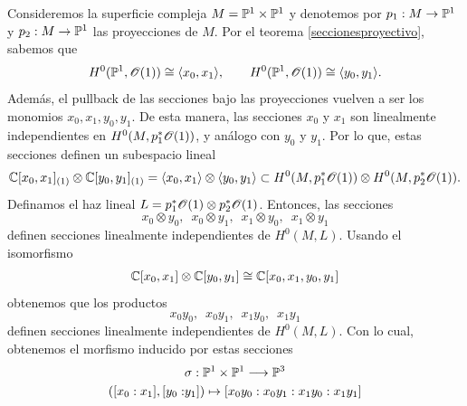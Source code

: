 	\begin{example}
		Consideremos la superficie compleja $M=\mathbb{P}^1\times\mathbb{P}^1$ y denotemos por $p_1:M\to \mathbb{P}^1$ y $p_2:M\to \mathbb{P}^1$ las proyecciones de $M$. Por el teorema \ref{seccionesproyectivo}, sabemos que
		\begin{equation*}
			H^0(\mathbb{P}^1,\mathscr{O}(1))\cong\langle x_0,x_1\rangle, \qquad H^0(\mathbb{P}^1,\mathscr{O}(1))\cong\langle y_0,y_1\rangle.
		\end{equation*}
		Además, el pullback de las secciones bajo las proyecciones vuelven a ser los monomios $x_0,x_1,y_0,y_1$. De esta manera, las secciones $x_0$ y $x_1$ son linealmente independientes en $H^0(M,p_1^*\mathscr{O}(1))$, y análogo con $y_0$ y $y_1$. Por lo que, estas secciones definen un subespacio lineal
		\begin{equation*}
			\mathbb{C}[x_0,x_1]_{(1)}\otimes \mathbb{C}[y_0,y_1]_{(1)}=\langle x_0,x_1\rangle\otimes \langle y_0,y_1\rangle\subset H^0(M,p_1^*\mathscr{O}(1))\otimes H^0(M,p_2^*\mathscr{O}(1)).
		\end{equation*}
		Definamos el haz lineal $L=p_1^*\mathscr{O}(1)\otimes p_2^*\mathscr{O}(1)$. Entonces, las secciones
		\begin{equation*}
			x_0\otimes y_0,\enspace x_0\otimes y_1,\enspace x_1\otimes y_0,\enspace x_1\otimes y_1
		\end{equation*}
		definen secciones linealmente independientes de $H^0(M,L)$. Usando el isomorfismo
		\begin{align*}
			\mathbb{C}[x_0,x_1]\otimes \mathbb{C}[y_0,y_1]\cong \mathbb{C}[x_0,x_1,y_0,y_1]
		\end{align*}
		obtenemos que los productos 
		\begin{equation*}
			x_0y_0,\enspace x_0y_1,\enspace x_1y_0,\enspace x_1y_1
		\end{equation*}
		definen secciones linealmente independientes de $H^0(M,L)$. Con lo cual, obtenemos el morfismo inducido por estas secciones
		\begin{align*}
				&\sigma:\mathbb{P}^1\times\mathbb{P}^1\longrightarrow \mathbb{P}^3\\
			([x_0:x_1],[y_0:&y_1])\mapsto [x_0y_0:x_0y_1:x_1y_0:x_1y_1]
		\end{align*}


\end{example}
